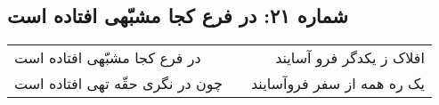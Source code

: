 \begin{center}
\section*{شماره ۲۱: در فرع کجا مشبّهی افتاده است}
\label{sec:021}
\begin{longtable}{l p{0.5cm} r}
در فرع کجا مشبّهی افتاده است
&&
افلاک ز یکدگر فرو آسایند
\\
چون در نگری حقّه تهی افتاده است
&&
یک ره همه از سفر فروآسایند
\\
\end{longtable}
\end{center}
